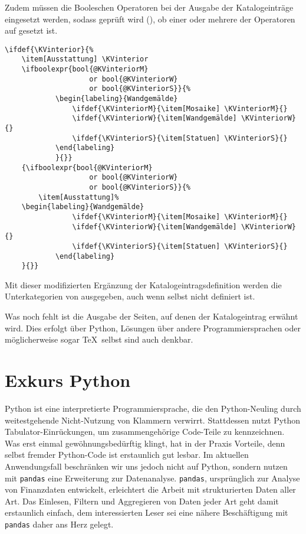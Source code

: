 \documentclass[ngerman]{dtk}
\begin{document}
Zudem müssen die Booleschen Operatoren bei der Ausgabe der Katalogeinträge eingesetzt werden,
sodass geprüft wird (), ob einer oder mehrere der Operatoren auf  gesetzt ist.
\begin{lstlisting}[style=number]
\ifdef{\KVinterior}{%
	\item[Ausstattung] \KVinterior 
	\ifboolexpr{bool{@KVinteriorM} 
					or bool{@KVinteriorW} 
					or bool{@KVinteriorS}}{%
			\begin{labeling}{Wandgemälde}
				\ifdef{\KVinteriorM}{\item[Mosaike] \KVinteriorM}{}
				\ifdef{\KVinteriorW}{\item[Wandgemälde] \KVinteriorW}{}
				\ifdef{\KVinteriorS}{\item[Statuen] \KVinteriorS}{}
			\end{labeling}
			}{}}
	{\ifboolexpr{bool{@KVinteriorM} 
					or bool{@KVinteriorW} 
					or bool{@KVinteriorS}}{%
		\item[Ausstattung]%
	\begin{labeling}{Wandgemälde}	
				\ifdef{\KVinteriorM}{\item[Mosaike] \KVinteriorM}{}
				\ifdef{\KVinteriorW}{\item[Wandgemälde] \KVinteriorW}{}
				\ifdef{\KVinteriorS}{\item[Statuen] \KVinteriorS}{}
			\end{labeling}
	}{}}
\end{lstlisting}
Mit dieser modifizierten Ergänzung der Katalogeintragsdefinition werden die Unterkategorien von  ausgegeben, 
auch wenn  selbst nicht definiert ist.


Was noch fehlt ist die Ausgabe der Seiten, auf denen der Katalogeintrag
 erwähnt wird. Dies erfolgt über Python, Lösungen über andere Programmiersprachen oder möglicherweise sogar \TeX\ selbst sind auch denkbar.

\section{Exkurs Python}

Python ist eine interpretierte Programmiersprache, die den Python-Neuling durch weitestgehende Nicht-Nutzung von Klammern verwirrt. Stattdessen nutzt Python Tabulator-Einrückungen, um zusammengehörige Code-Teile zu kennzeichnen. Was erst einmal gewöhnungsbedürftig klingt, hat in der Praxis Vorteile, denn selbst fremder Python-Code ist erstaunlich gut lesbar. Im aktuellen Anwendungsfall beschränken wir uns jedoch nicht auf Python, sondern nutzen mit  \verb|pandas| eine Erweiterung zur Datenanalyse. \verb|pandas|, ursprünglich zur Analyse von Finanzdaten entwickelt, erleichtert die Arbeit mit strukturierten Daten aller Art. Das Einlesen, Filtern und Aggregieren von Daten jeder Art geht damit erstaunlich einfach, dem interessierten Leser sei eine nähere Beschäftigung mit \verb|pandas| daher ans Herz gelegt.
\end{document}
